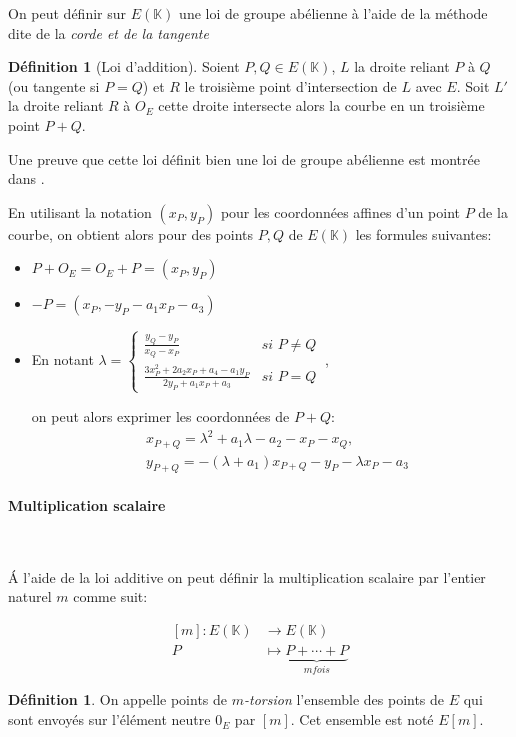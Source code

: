 \documentclass[10pt,a4paper]{book}
\theoremstyle{plain}
\theoremstyle{definition}
\theoremstyle{definition}
\theoremstyle{definition}
\theoremstyle{definition}
\newtheorem{defi}[thm]{Définition}
\theoremstyle{remark}
\theoremstyle{remark}
\begin{document}
On peut définir sur $E(\mathbb{K})$ une loi de groupe abélienne à l'aide de la méthode dite de la \emph{corde et de la tangente}

\begin{defi}[Loi d'addition]
Soient $P,Q \in E(\mathbb{K})$, $L$ la droite reliant $P$ à $Q$ (ou tangente si $P=Q$) et $R$ le troisième point d'intersection de $L$ avec $E$. Soit $L'$ la droite reliant $R$ à $O_E$ cette droite intersecte alors la courbe en un troisième point $P+Q$.
\end{defi}

Une preuve que cette loi définit bien une loi de groupe abélienne est montrée dans \cite[III.2.2]{Silv1}.

En utilisant la notation $(x_P,y_P)$ pour les coordonnées affines d'un point $P$ de la courbe, on obtient alors pour des points $P,Q$ de $E(\mathbb{K})$ les formules suivantes:
\begin{itemize}
\item $P+O_E=O_E+P=(x_P,y_P)$
\item $-P=(x_P,-y_P-a_1x_P-a_3)$
\item En notant $\lambda= \begin{cases}
\frac{y_{Q}-y_{P}}{x_{Q}-x_{P}} & \textit{si } P\neq Q\\
\frac{3x_{P}^{2}+2a_{2}x_{P}+a_{4}-a_{1}y_{P}}{2y_{P}+a_{1}x_{P}+a_{3}} & \textit{si } P=Q
\end{cases}\ $,

on peut alors exprimer les coordonnées de $P+Q$:
\begin{equation*}
\begin{alignedat}{1}
& x_{P+Q}=\lambda^2 +a_1\lambda-a_2-x_P-x_Q,\\
& y_{P+Q}=-(\lambda +a_1)x_{P+Q}-y_{P}-\lambda x_P-a_3
\end{alignedat}
\end{equation*}
\end{itemize}




\paragraph*{Multiplication scalaire}\   {
\newline


\'A l'aide de la loi additive on peut définir la multiplication scalaire par l'entier naturel $m$ comme suit:

\begin{equation}
\begin{alignedat}{1}
[m]: E(\mathbb{K}) & \rightarrow E(\mathbb{K}) \\
P & \mapsto \underbrace{P+ \cdots +P}_{m fois} 
\end{alignedat}
\end{equation}

\begin{defi}
On appelle points de \emph{$m$-torsion} l'ensemble des points de $E$ qui sont envoyés sur l'élément neutre $0_E$ par $[m]$. Cet ensemble est noté $E[m]$.
\end{defi}
}
\end{document}

